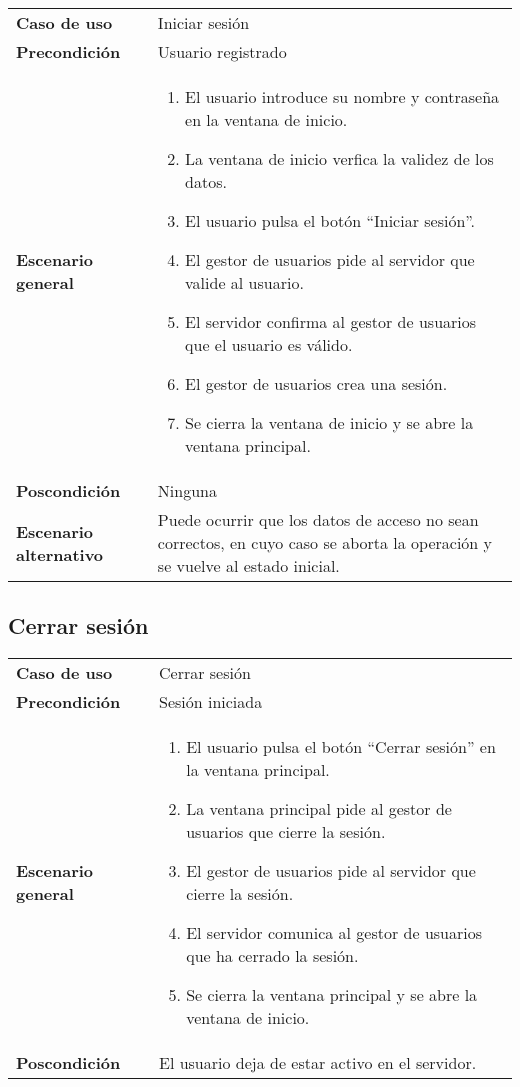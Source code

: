 {\footnotesize
\begin{tabularx}{0.95\textwidth}{p{}|X}

\textbf{Caso de uso} & Iniciar sesión \\

\textbf{Precondición} & Usuario registrado \\

\textbf{Escenario general} & \begin{enumerate}
\item El usuario introduce su nombre y contraseña en la ventana de inicio.
\item La ventana de inicio verfica la validez de los datos.
\item El usuario pulsa el botón ``Iniciar sesión''.
\item El gestor de usuarios pide al servidor que valide al usuario.
\item El servidor confirma al gestor de usuarios que el usuario es válido.
\item El gestor de usuarios crea una sesión.
\item Se cierra la ventana de inicio y se abre la ventana principal.
\end{enumerate} \\

\textbf{Poscondición} & Ninguna \\

\textbf{Escenario alternativo} & Puede ocurrir que los datos de acceso no sean
correctos, en cuyo caso se aborta la operación y se vuelve al estado inicial.

\end{tabularx}
}

\subsection{Cerrar sesión}

{\footnotesize
\begin{tabularx}{0.95\textwidth}{p{}|X}

\textbf{Caso de uso} & Cerrar sesión \\

\textbf{Precondición} & Sesión iniciada \\

\textbf{Escenario general} & \begin{enumerate}
\item El usuario pulsa el botón ``Cerrar sesión'' en la ventana principal.
\item La ventana principal pide al gestor de usuarios que cierre la sesión.
\item El gestor de usuarios pide al servidor que cierre la sesión.
\item El servidor comunica al gestor de usuarios que ha cerrado la sesión.
\item Se cierra la ventana principal y se abre la ventana de inicio.
\end{enumerate} \\

\textbf{Poscondición} & El usuario deja de estar activo en el servidor.

\end{tabularx}
}

